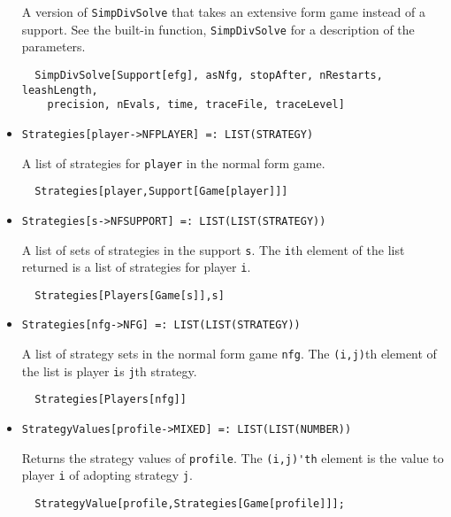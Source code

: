\begin{itemize}
\bd 
A version of \verb+SimpDivSolve+ that takes an extensive form
game instead of a support.  See the built-in function,
\verb+SimpDivSolve+ for a description of the parameters.
\begin{verbatim}
  SimpDivSolve[Support[efg], asNfg, stopAfter, nRestarts, leashLength,
    precision, nEvals, time, traceFile, traceLevel]
\end{verbatim} 
\ed

\item{}
\protect \large \begin{verbatim}
Strategies[player->NFPLAYER] =: LIST(STRATEGY) 
\end{verbatim}\normalsize

\bd 
A list of strategies for \verb+player+ in the normal form game.  
\begin{verbatim}
  Strategies[player,Support[Game[player]]]
\end{verbatim} 
\ed

\item{}
\protect \large \begin{verbatim}
Strategies[s->NFSUPPORT] =: LIST(LIST(STRATEGY)) 
\end{verbatim}\normalsize

\bd 
A list of sets of strategies in the support \verb+s+. The \verb+i+th
element of the list returned is a list of strategies for player
\verb+i+.   
\begin{verbatim}
  Strategies[Players[Game[s]],s]
\end{verbatim} 
\ed


\item{}
\protect \large \begin{verbatim}
Strategies[nfg->NFG] =: LIST(LIST(STRATEGY)) 
\end{verbatim}\normalsize

\bd 
A list of strategy sets in the normal form game \verb+nfg+. The
\verb+(i,j)+th element of the list is player \verb+i+s \verb+j+th
strategy.  
\begin{verbatim}
  Strategies[Players[nfg]]
\end{verbatim} 
\ed

\item{}
\protect \large \begin{verbatim}
StrategyValues[profile->MIXED] =: LIST(LIST(NUMBER)) 
\end{verbatim}\normalsize

\bd 
Returns the strategy values of \verb+profile+.  The
\verb+(i,j)'th+ element is the value to player \verb+i+ of adopting
strategy \verb+j+. 
\begin{verbatim}
  StrategyValue[profile,Strategies[Game[profile]]];
\end{verbatim} 
\ed


\end{itemize}
